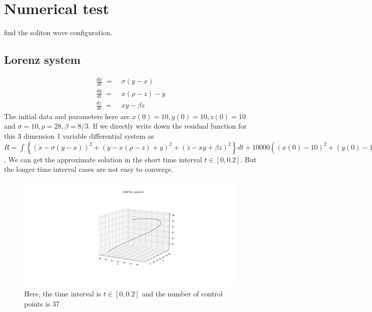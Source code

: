 \documentclass[12pt]{article}
\begin{document}
\section{Numerical test}


find the soliton wave configuration.





\subsection{Lorenz system}


\begin{align*}
	\frac{dx}{dt} \;=\; & \sigma(y-x) \\
	\frac{dy}{dt} \;=\; & x(\rho-z) - y \\
	\frac{dz}{dt} \;=\; & xy-\beta z
\end{align*}
%
The initial data and parameters here are $x(0)=10,y(0)=10,z(0)=10$ and $\sigma=10,\rho=28,\beta=8/3$.
If we directly write down the residual function for this 3 dimension 1 variable differential system as $R = \int \left\{ (\dot{x}-\sigma(y-x))^2 + (\dot{y}-x(\rho-z)+y)^2 + (\dot{z}-xy+\beta z)^2 \right\} dt + 10000((x(0)-10)^2+(y(0)-10)^2+(z(0)-10)^2)$.
We can get the approximate solution in the short time interval $t\in [0,0.2]$.
But the longer time interval cases are not easy to converge.

\begin{figure}[H]
	\centering
	\includegraphics[width=1.0\linewidth]{../lorenz_system/data/lorenz_system_ex.png}
	\caption{Here, the time interval is $t\in [0,0.2]$ and the number of control points is 37}
\end{figure}
\end{document}

